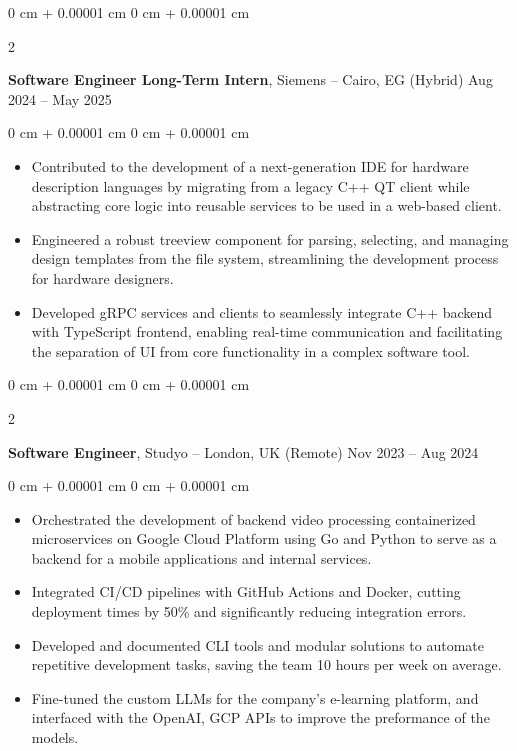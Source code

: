 \documentclass[10pt, letterpaper]{article}
\newenvironment{highlights}{
    \begin{itemize}[
        topsep=0.10 cm,
        parsep=0.10 cm,
        partopsep=0pt,
        itemsep=0pt,
        leftmargin=0 cm + 10pt
    ]
}{
    \end{itemize}
} %
\newenvironment{onecolentry}{
    \begin{adjustwidth}{
        0 cm + 0.00001 cm
    }{
        0 cm + 0.00001 cm
    }
}{
    \end{adjustwidth}
} %
\newenvironment{twocolentry}[2][]{
    \onecolentry
    \def\secondColumn{#2}
    \setcolumnwidth{\fill, 4.5 cm}
    \begin{paracol}{2}
}{
    \switchcolumn \raggedleft \secondColumn
    \end{paracol}
    \endonecolentry
} %
\begin{document}
\vspace{0.4 cm}

\begin{twocolentry}{
        Aug 2024 – May 2025
    }
    \textbf{Software Engineer Long-Term Intern}, Siemens -- Cairo, EG (Hybrid)\end{twocolentry}

\vspace{0.10 cm}
\begin{onecolentry}
    \begin{highlights}
        \item Contributed to the development of a next-generation IDE for hardware description languages by migrating from a legacy C++ QT client while abstracting core logic into reusable services to be used in a web-based client.

        \item Engineered a robust treeview component for parsing, selecting, and managing design templates from the file system, streamlining the development process for hardware designers.
        \item Developed gRPC services and clients to seamlessly integrate C++ backend with TypeScript frontend, enabling real-time communication and facilitating the separation of UI from core functionality in a complex software tool.

    \end{highlights}
\end{onecolentry}


\vspace{0.4 cm}

\begin{twocolentry}{
        Nov 2023 – Aug 2024
    }
    \textbf{Software Engineer}, Studyo -- London, UK (Remote)\end{twocolentry}

\vspace{0.10 cm}
\begin{onecolentry}
    \begin{highlights}
        \item Orchestrated the development of backend video processing containerized microservices on Google Cloud Platform using Go and Python to serve as a backend for a mobile applications and internal services.
        \item Integrated CI/CD pipelines with GitHub Actions and Docker, cutting deployment times by 50\% and significantly reducing integration errors.
        \item Developed and documented CLI tools and modular solutions to automate repetitive development tasks, saving the team 10 hours per week on average.
        \item Fine-tuned the custom LLMs for the company's e-learning platform, and interfaced with the OpenAI, GCP APIs to improve the preformance of the models.
    \end{highlights}
\end{onecolentry}
\end{document}
